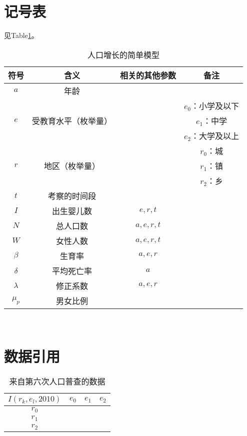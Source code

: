 \documentclass[11pt]{article}
\begin{document}
\section{记号表}
见Table\ref{simple_symbol}。
	\begin{table}[]
		\centering
		\caption{人口增长的简单模型}
		\label{simple_symbol}
		\begin{tabular}{cccc}
			\hline
			符号		&	含义									&	相关的其他参数	&	备注 \\
			\hline
			$a$			&	年龄									&	& \\&&&$e_0$：小学及以下\\
			$e$			&	受教育水平（枚举量）	&									& 	$e_1$：中学	\\	&&&$e_2$：大学及以上	\\&&&$r_0$：城\\
			$r$			&	地区（枚举量）				&									& $r_1$：镇	\\	&&&$r_2$：乡	\\
			$t$			&	考察的时间段					&	& \\
			$I$			&	出生婴儿数						&	$e,r,t$		& \\
			$N$			&	总人口数							&	$a,e,r,t$ & \\
			$W$		&	女性人数							&	$a,e,r,t$	& \\
			$\beta$	&	生育率								&	$a,e,r$	& \\
			$\delta$	&	平均死亡率						&	$a$			& \\
			$\lambda$	&	修正系数						&	$a,e,r$	& \\
			$\mu_p$& 男女比例								&	& \\
			\hline
		\end{tabular} \\
	\end{table}
\section{数据引用}
		\begin{table}[]
		\centering
		\caption{来自第六次人口普查的数据}
		\label{simple_data}
		\begin{tabular}{c|ccc}
			\hline
			$I(r_k, e_l, 2010)$		&	$e_0$	&	$e_1$	&	$e_2$ \\
			\hline
			$r_0$							&		&		&	\\
			$r_1$							&		&		&	\\
			$r_2$							&		&		&	\\
			\hline
		\end{tabular}
	\end{table}
\end{document}
